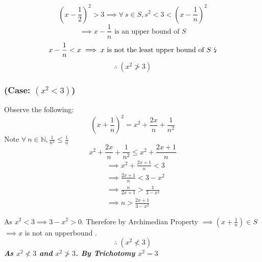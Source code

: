 \documentclass[11pt]{article}
\theoremstyle{plain}
\begin{document}
\[ (x-\frac{1}{2})^2 > 3 \implies \forall ~ s \in S, s^2 < 3 < (x-\frac{1}{n})^2         \]
\[ \implies x-\frac{1}{n} \text{ is an upper bound of } S \]
\[ x-\frac{1}{n} < x \implies x \text{ is not the least upper bound of $S$ \lightning} \]
\[ \therefore ~(x^2 \not > 3) \]
\subsubsection*{(Case: $(x^2<3)$)}
Observe the following:
\[
	(x+\frac{1}{n})^2 = x^2 + \frac{2x}{n} + \frac{1}{n^2}
\]
Note $\forall ~n \in \mathbb{N}, \frac{1}{n^2} \leq  \frac{1}{n}$
\[
	x^2 + \frac{2x}{n} + \frac{1}{n^2} \leq  x^2 + \frac{2x+1}{n}
\]
\[
	\begin{aligned}
		 & \implies x^2 + \frac{2x+1}{n} < 3         \\
		 & \implies \frac{2x+1}{n} < 3 - x^2         \\
		 & \implies \frac{n}{2x+1} > \frac{1}{3-x^2} \\
		 & \implies n > \frac{2x+1}{3-x^2}
	\end{aligned}
\]
\begin{center}
	As $x^2 < 3 \implies 3-x^2 > 0$. Therefore by Archimedian Property $\implies  (x+\frac{1}{n}) \in S$\\
	$\implies x$ is not an upperbound \lightning.
	\[ \therefore ~(x^2 \not < 3) \]
	\textbf{\textit{ As $x^2 \not < 3$ and $x^2 \not > 3$. By Trichotomy $x^2=3$ }}
\end{center}
\end{document}
